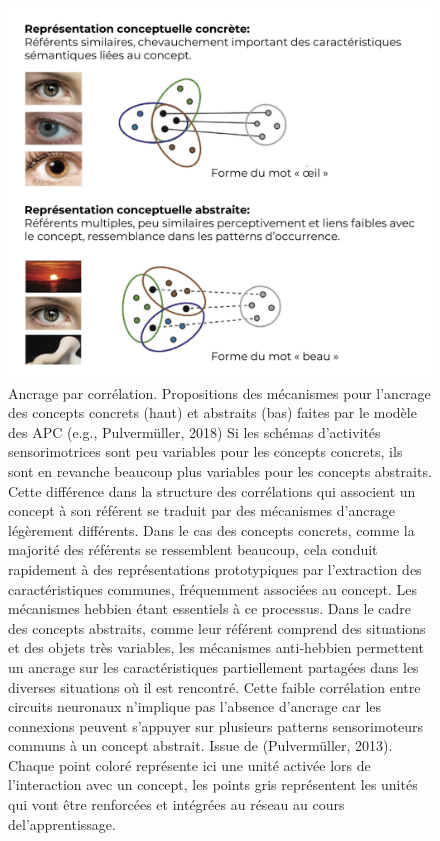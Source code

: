 \documentclass[
  a4paper,12pt,twoside,onecolumn,openright,final,oldfontcommands]{memoir}
\begin{document}
\begin{figure}[htbp!]

{\centering \includegraphics[width=1\linewidth]{figures/chap2-fig5} 

}

\caption{Ancrage par corrélation. Propositions des mécanismes pour l’ancrage des concepts concrets (haut) et abstraits (bas) faites par le modèle des APC (e.g., Pulvermüller, 2018) Si les schémas d’activités sensorimotrices sont peu variables pour les concepts concrets, ils sont en revanche beaucoup plus variables pour les concepts abstraits. Cette différence dans la structure des corrélations qui associent un concept à son référent se traduit par des mécanismes d’ancrage légèrement différents. Dans le cas des concepts concrets, comme la majorité des référents se ressemblent beaucoup, cela conduit rapidement à des représentations prototypiques par l’extraction des caractéristiques communes, fréquemment associées au concept. Les mécanismes hebbien étant essentiels à ce processus. Dans le cadre des concepts abstraits, comme leur référent comprend des situations et des objets très variables, les mécanismes anti-hebbien permettent un ancrage sur les caractéristiques partiellement partagées dans les diverses situations où il est rencontré. Cette faible corrélation entre circuits neuronaux n’implique pas l’absence d’ancrage car les connexions peuvent s’appuyer sur plusieurs patterns sensorimoteurs communs à un concept abstrait. Issue de (Pulvermüller, 2013). Chaque point coloré représente ici une unité activée lors de l’interaction avec un concept, les points gris représentent les unités qui vont être renforcées et intégrées au réseau au cours del'apprentissage.}\label{fig:chap2-fig5}
\end{figure}
\end{document}
